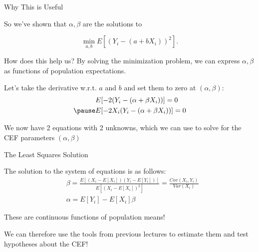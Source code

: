 \documentclass[11pt,english,handout]{beamer}
\newenvironment{wideitemize}{\itemize\addtolength{\itemsep}{10pt}}{\enditemize}
\begin{document}
\begin{frame}{Why This is Useful}
\begin{wideitemize}

\item
So we've shown that $\alpha,\beta$ are the solutions to 

$$\min_{a,b}E[ (Y_i -  (a+ b X_i)  )^2  ] .$$

\item 
How does this help us? \pause By solving the minimization problem, we can express $\alpha,\beta$ as functions of population expectations. 

\pause
\item
Let's take the derivative w.r.t. $a$ and $b$ and set them to zero at $(\alpha,\beta)$: \pause
\begin{align*}
& E[-2  (Y_i - (\alpha + \beta X_i )) ] = 0 \\ \pause
& E[-2  X_i (Y_i -(\alpha + \beta X_i)) ] = 0
\end{align*}

\pause
\item
We now have 2 equations with 2 unknowns, which we can use to solve for the CEF parameters $(\alpha,\beta)$

\end{wideitemize}
\end{frame}

\begin{frame}{The Least Squares Solution}
\begin{wideitemize}
\item
The solution to the system of equations is as follows:
\begin{align*}
& \beta = \frac{E[ (X_i -E[X_i]) (Y_i - E[Y_i])  ]}{E[ (X_i - E[X_i])^2 ]} = \frac{Cov(X_i, Y_i)}{Var(X_i)} \\ 
& \alpha = E[Y_i] - E[X_i] \beta
\end{align*}

\pause
\item
These are continuous functions of population means!

\pause
\item
We can therefore use the tools from previous lectures to estimate them and test hypotheses about the CEF! 
\end{wideitemize}	
\end{frame}
\end{document}
